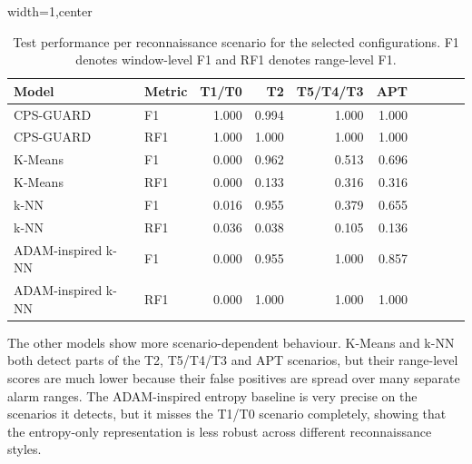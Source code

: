 \begin{table}[htbp]
\centering
\scriptsize
\caption{Test performance per reconnaissance scenario for the selected configurations. F1 denotes window-level F1 and RF1 denotes range-level F1.}
\renewcommand{\arraystretch}{1}
\setlength{\tabcolsep}{8pt}
\begin{adjustbox}{width=1\textwidth,center}
\begin{tabular}{l l r r r r r r r r}
\toprule
Model & Metric & T1/T0 & T2 & T5/T4/T3 & APT \\
\midrule
CPS-GUARD & F1  & 1.000 & 0.994 & 1.000 & 1.000 \\
CPS-GUARD & RF1 & 1.000 & 1.000 & 1.000 & 1.000 \\

K-Means & F1  & 0.000 & 0.962 & 0.513 & 0.696 \\
K-Means & RF1 & 0.000 & 0.133 & 0.316 & 0.316 \\

k-NN & F1  & 0.016 & 0.955 & 0.379 & 0.655 \\
k-NN & RF1 & 0.036 & 0.038 & 0.105 & 0.136 \\

ADAM-inspired k-NN & F1  & 0.000 & 0.955 & 1.000 & 0.857 \\
ADAM-inspired k-NN & RF1 & 0.000 & 1.000 & 1.000 & 1.000 \\
\bottomrule
\end{tabular}
\end{adjustbox}

\label{tab:per_attack_selected_models}
\end{table}

The other models show more scenario-dependent behaviour. K-Means and k-NN both detect parts of the T2, T5/T4/T3 and APT scenarios, but their range-level scores are much lower because their false positives are spread over many separate alarm ranges. The ADAM-inspired entropy baseline is very precise on the scenarios it detects, but it misses the T1/T0 scenario completely, showing that the entropy-only representation is less robust across different reconnaissance styles.






